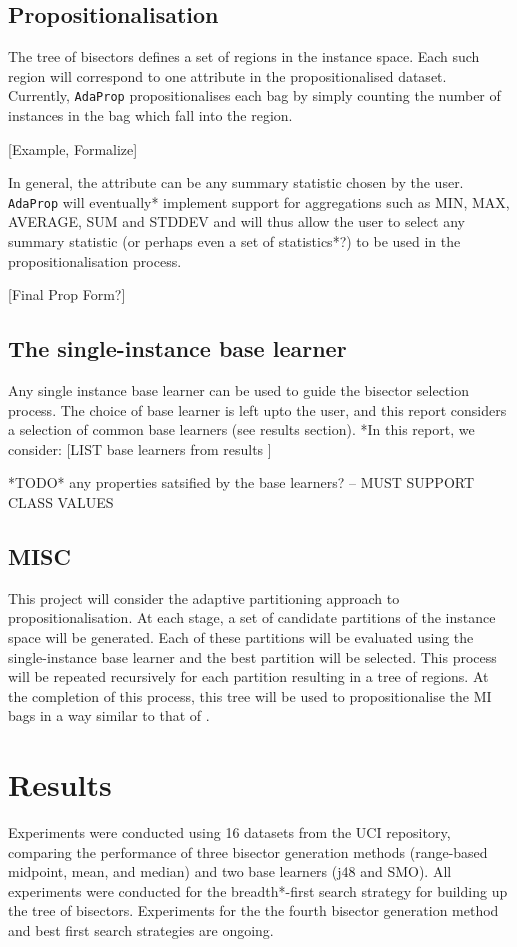 \documentclass[a4paper,12pt]{article} %
\newcommand{\AdaProp}{\texttt{AdaProp}\xspace}
\begin{document}
\subsection{Propositionalisation}
The tree of bisectors defines a set of regions in the instance space.
Each such region will correspond to one attribute in the propositionalised dataset.
Currently, \AdaProp propositionalises each bag 
    by simply counting the number of instances in the bag which fall into the region.
    
[Example, Formalize] 

In general, the attribute can be any summary statistic chosen by the user.
\AdaProp will eventually* implement support for aggregations such as 
    MIN, MAX, AVERAGE, SUM and STDDEV and 
    will thus allow the user to select any summary statistic 
    (or perhaps even a set of statistics*?) 
    to be used in the propositionalisation process.
    
[Final Prop Form?]
    

\subsection{The single-instance base learner}    
Any single instance base learner can be used to guide the bisector selection process.
The choice of base learner is left upto the user, and 
    this report considers a selection of common base learners (see results section).
*In this report, we consider: [LIST base learners from results ]    

*TODO* any properties satsified by the base learners?
-- MUST SUPPORT CLASS VALUES
    
\subsection{MISC}
This project will consider the adaptive partitioning approach to propositionalisation.
At each stage, a set of candidate partitions of the instance space will be generated. Each of these partitions will be evaluated using the  single-instance base learner and the best partition will be selected. This process will be repeated recursively for each partition resulting in a tree of regions. At the completion of this process, this tree will be used to propositionalise the MI bags in a way similar to that of .




\section{Results}
Experiments were conducted using 16 datasets from the UCI repository, 
    comparing the performance of three bisector generation methods 
    (range-based midpoint, mean, and median)
    and two base learners (j48 and SMO).
All experiments were conducted for the breadth*-first search strategy for 
    building up the tree of bisectors.
Experiments for the the fourth bisector generation method and best first search strategies 
    are ongoing.
    
\end{document}
